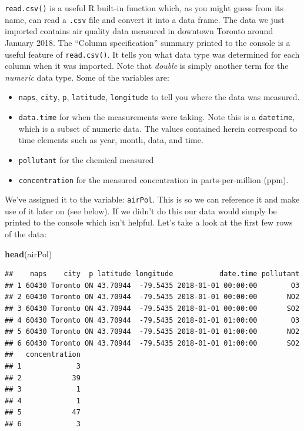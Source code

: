 \documentclass[
]{book}
\newenvironment{Shaded}{\begin{snugshade}}{\end{snugshade}}
\newcommand{\FunctionTok}[1]{\textcolor[rgb]{0.13,0.29,0.53}{\textbf{#1}}}
\newcommand{\NormalTok}[1]{#1}
\providecommand{\tightlist}{%
  \setlength{\itemsep}{0pt}\setlength{\parskip}{0pt}}
\begin{document}
\texttt{read.csv()} is a useful R built-in function which, as you might guess from its name, can read a \texttt{.csv} file and convert it into a data frame. The data we just imported contains air quality data measured in downtown Toronto around January 2018. The ``Column specification'' summary printed to the console is a useful feature of \texttt{read.csv()}. It tells you what data type was determined for each column when it was imported. Note that \emph{double} is simply another term for the \emph{numeric} data type. Some of the variables are:

\begin{itemize}
\tightlist
\item
  \texttt{naps}, \texttt{city}, \texttt{p}, \texttt{latitude}, \texttt{longitude} to tell you where the data was measured.
\item
  \texttt{data.time} for when the measurements were taking. Note this is a \texttt{datetime}, which is a subset of numeric data. The values contained herein correspond to time elements such as year, month, data, and time.
\item
  \texttt{pollutant} for the chemical measured
\item
  \texttt{concentration} for the measured concentration in parts-per-million (ppm).
\end{itemize}

We've assigned it to the variable: \texttt{airPol}. This is so we can reference it and make use of it later on (see below). If we didn't do this our data would simply be printed to the console which isn't helpful. Let's take a look at the first few rows of the data:

\begin{Shaded}
\begin{Highlighting}[]
\FunctionTok{head}\NormalTok{(airPol)}
\end{Highlighting}
\end{Shaded}

\begin{verbatim}
##    naps    city  p latitude longitude           date.time pollutant
## 1 60430 Toronto ON 43.70944  -79.5435 2018-01-01 00:00:00        O3
## 2 60430 Toronto ON 43.70944  -79.5435 2018-01-01 00:00:00       NO2
## 3 60430 Toronto ON 43.70944  -79.5435 2018-01-01 00:00:00       SO2
## 4 60430 Toronto ON 43.70944  -79.5435 2018-01-01 01:00:00        O3
## 5 60430 Toronto ON 43.70944  -79.5435 2018-01-01 01:00:00       NO2
## 6 60430 Toronto ON 43.70944  -79.5435 2018-01-01 01:00:00       SO2
##   concentration
## 1             3
## 2            39
## 3             1
## 4             1
## 5            47
## 6             3
\end{verbatim}
\end{document}
